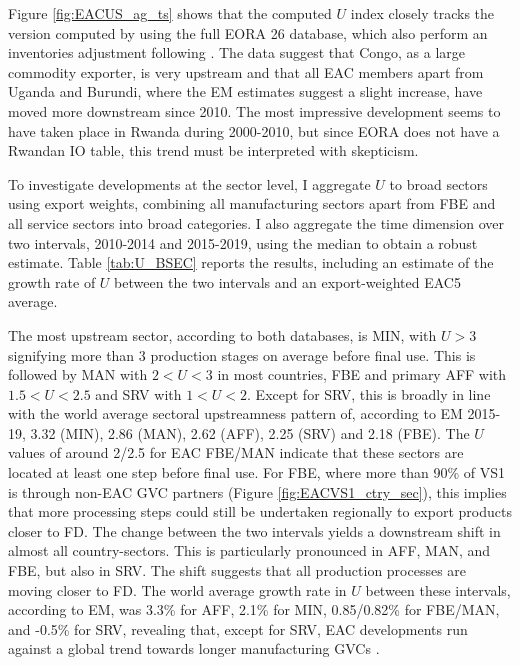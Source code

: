 \documentclass[a4paper]{article}
\begin{document}
Figure \ref{fig:EACUS_ag_ts} shows that the computed $U$ index closely tracks the version computed by \citet{mancini2023positioning} using the full EORA 26 database, which also perform an inventories adjustment following \citet{antras2018measurement}. The data suggest that Congo, as a large commodity exporter, is very upstream and that all EAC members apart from Uganda and Burundi, where the EM estimates suggest a slight increase, have moved more downstream since 2010. The most impressive development seems to have taken place in Rwanda during 2000-2010, but since EORA does not have a Rwandan IO table, this trend must be interpreted with skepticism. \newline

To investigate developments at the sector level, I aggregate $U$ to broad sectors using export weights, combining all manufacturing sectors apart from FBE and all service sectors into broad categories. I also aggregate the time dimension over two intervals, 2010-2014 and 2015-2019, using the median to obtain a robust estimate. Table \ref{tab:U_BSEC} reports the results, including an estimate of the growth rate of $U$ between the two intervals and an export-weighted EAC5 average. \newline 

 The most upstream sector, according to both databases, is MIN, with $U>3$ signifying more than 3 production stages on average before final use. This is followed by MAN with $2 <U <3$ in most countries, FBE and primary AFF with $1.5 <U <2.5$ and SRV with $1 <U <2$. Except for SRV, this is broadly in line with the world average sectoral upstreamness pattern of, according to EM 2015-19, 3.32 (MIN), 2.86 (MAN), 2.62 (AFF), 2.25 (SRV) and 2.18 (FBE). The $U$ values of around 2/2.5 for EAC FBE/MAN indicate that these sectors are located at least one step before final use. For FBE, where more than 90\% of VS1 is through non-EAC GVC partners (Figure \ref{fig:EACVS1_ctry_sec}), this implies that more processing steps could still be undertaken regionally to export products closer to FD. The change between the two intervals yields a downstream shift in almost all country-sectors. This is particularly pronounced in AFF, MAN, and FBE, but also in SRV. The shift suggests that all production processes are moving closer to FD. The world average growth rate in $U$ between these intervals, according to EM, was 3.3\% for AFF, 2.1\% for MIN, 0.85/0.82\% for FBE/MAN, and -0.5\% for SRV, revealing that, except for SRV, EAC developments run against a global trend towards longer manufacturing GVCs \citep{antras2018measurement}. 
\end{document}
